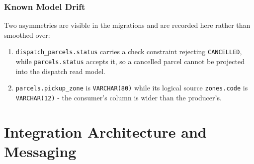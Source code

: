 \documentclass[11pt,a4paper,oneside,openany]{report}
\newcommand{\code}[1]{\texttt{\small #1}}
\begin{document}
\subsection{Known Model Drift}
Two asymmetries are visible in the migrations and are recorded here rather than smoothed over:
\begin{enumerate}[leftmargin=*]
\item \code{dispatch\_parcels.status} carries a check constraint rejecting \code{CANCELLED}, while
\code{parcels.status} accepts it, so a cancelled parcel cannot be projected into the dispatch read
model.
\item \code{parcels.pickup\_zone} is \code{VARCHAR(80)} while its logical source
\code{zones.code} is \code{VARCHAR(12)} - the consumer's column is wider than the producer's.
\end{enumerate}

\chapter{Integration Architecture and Messaging}
\end{document}
